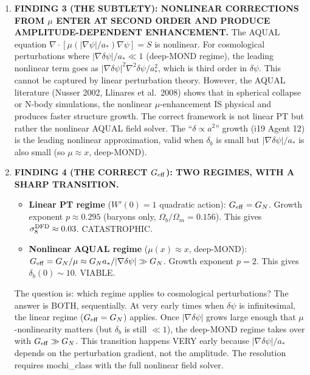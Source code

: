 \documentclass[11pt]{article}
\newcommand{\dpsi}{\delta\psi}
\newcommand{\astar}{a_*}
\begin{document}
\begin{tcolorbox}[colback=blue!5!white, colframe=blue!70!black,
  title=\textbf{W4i20 TOP 5 FINDINGS --- THE $G_{\rm eff}$ RESOLUTION}]
\begin{enumerate}
\item \textbf{FINDING 3 (THE SUBTLETY): NONLINEAR CORRECTIONS FROM $\mu$
  ENTER AT SECOND ORDER AND PRODUCE AMPLITUDE-DEPENDENT ENHANCEMENT.}
  The AQUAL equation $\nabla\cdot[\mu(|\nabla\psi|/\astar)\nabla\psi] = S$
  is nonlinear. For cosmological perturbations where $|\nabla\dpsi|/\astar
  \ll 1$ (deep-MOND regime), the leading nonlinear term goes as
  $|\nabla\dpsi|^2 \nabla^2\dpsi / \astar^2$, which is third order in $\dpsi$.
  This cannot be captured by linear perturbation theory. However, the
  AQUAL literature (Nusser 2002, Llinares et al.\ 2008) shows that
  in spherical collapse or N-body simulations, the nonlinear $\mu$-enhancement
  IS physical and produces faster structure growth. The correct framework
  is not linear PT but rather the nonlinear AQUAL field solver. The
  ``$\delta \propto a^2$'' growth (i19 Agent 12) is the leading nonlinear
  approximation, valid when $\delta_b$ is small but $|\nabla\dpsi|/\astar$
  is also small (so $\mu \approx x$, deep-MOND).

\item \textbf{FINDING 4 (THE CORRECT $G_{\rm eff}$): TWO REGIMES,
  WITH A SHARP TRANSITION.}
  \begin{itemize}[nosep]
  \item \textbf{Linear PT regime} ($W'(0) = 1$ quadratic action):
    $G_{\rm eff} = G_N$. Growth exponent $p \approx 0.295$ (baryons
    only, $\Omega_b/\Omega_m = 0.156$). This gives
    $\sigma_8^{\rm DFD} \approx 0.03$. CATASTROPHIC.
  \item \textbf{Nonlinear AQUAL regime} ($\mu(x) \approx x$, deep-MOND):
    $G_{\rm eff} = G_N/\mu \approx G_N \astar/|\nabla\dpsi| \gg G_N$.
    Growth exponent $p = 2$. This gives $\delta_b(0) \sim 10$.
    VIABLE.
  \end{itemize}
  The question is: which regime applies to cosmological perturbations?
  The answer is BOTH, sequentially. At very early times when $\dpsi$ is
  infinitesimal, the linear regime ($G_{\rm eff} = G_N$) applies.
  Once $|\nabla\dpsi|$ grows large enough that $\mu$-nonlinearity
  matters (but $\delta_b$ is still $\ll 1$), the deep-MOND regime
  takes over with $G_{\rm eff} \gg G_N$. This transition happens
  VERY early because $|\nabla\dpsi|/\astar$ depends on the
  perturbation gradient, not the amplitude.
  The resolution requires mochi\_class with the full nonlinear
  field solver.


\end{enumerate}
\end{tcolorbox}
\end{document}
